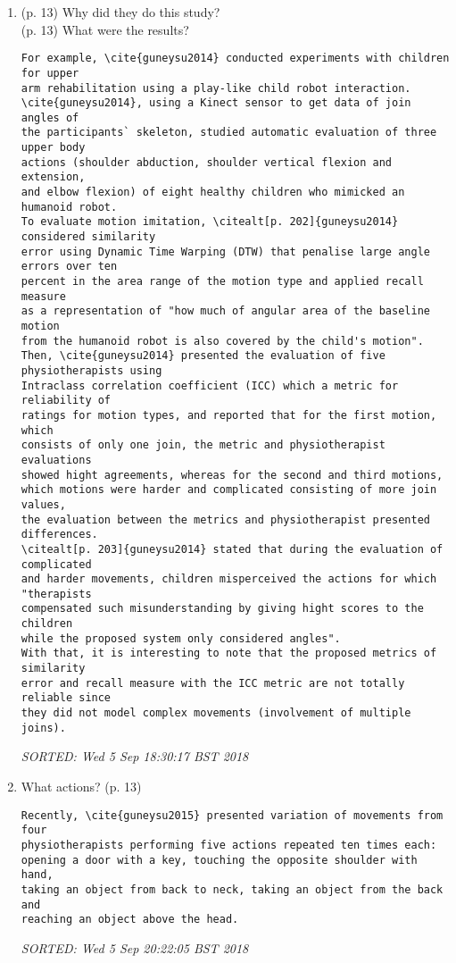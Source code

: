 \documentclass[10pt]{article}
\begin{document}
\begin{enumerate}[noitemsep,topsep=0pt]
\item (p. 13) Why did they do this study?
	\\ (p. 13) What were the results? 
\begin{verbatim}
For example, \cite{guneysu2014} conducted experiments with children for upper 
arm rehabilitation using a play-like child robot interaction.
\cite{guneysu2014}, using a Kinect sensor to get data of join angles of 
the participants` skeleton, studied automatic evaluation of three upper body 
actions (shoulder abduction, shoulder vertical flexion and extension, 
and elbow flexion) of eight healthy children who mimicked an humanoid robot.
To evaluate motion imitation, \citealt[p. 202]{guneysu2014} considered similarity 
error using Dynamic Time Warping (DTW) that penalise large angle errors over ten 
percent in the area range of the motion type and applied recall measure 
as a representation of "how much of angular area of the baseline motion
from the humanoid robot is also covered by the child's motion".
Then, \cite{guneysu2014} presented the evaluation of five physiotherapists using 
Intraclass correlation coefficient (ICC) which a metric for reliability of 
ratings for motion types, and reported that for the first motion, which 
consists of only one join, the metric and physiotherapist evaluations 
showed hight agreements, whereas for the second and third motions, 
which motions were harder and complicated consisting of more join values, 
the evaluation between the metrics and physiotherapist presented differences.
\citealt[p. 203]{guneysu2014} stated that during the evaluation of complicated 
and harder movements, children misperceived the actions for which "therapists
compensated such misunderstanding by giving hight scores to the children
while the proposed system only considered angles".
With that, it is interesting to note that the proposed metrics of similarity 
error and recall measure with the ICC metric are not totally reliable since 
they did not model complex movements (involvement of multiple joins).
\end{verbatim}
\textit{
SORTED: Wed  5 Sep 18:30:17 BST 2018
}
\\





\item What actions? (p. 13)

\begin{verbatim}
Recently, \cite{guneysu2015} presented variation of movements from four 
physiotherapists performing five actions repeated ten times each: 
opening a door with a key, touching the opposite shoulder with hand, 
taking an object from back to neck, taking an object from the back and 
reaching an object above the head.
\end{verbatim}
\textit{
SORTED: Wed  5 Sep 20:22:05 BST 2018
}
\\




\end{enumerate}
\end{document}
